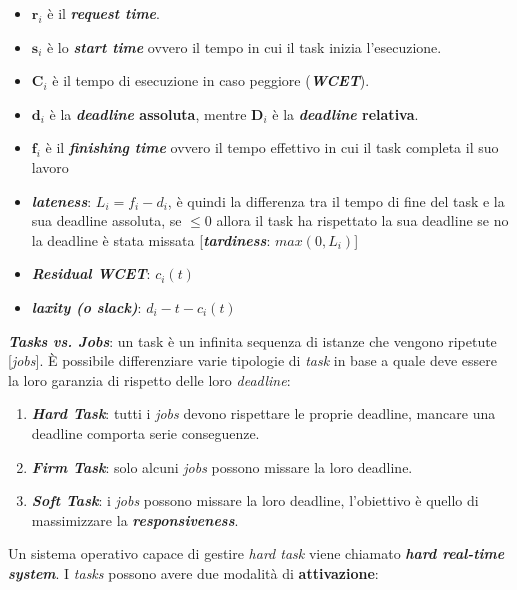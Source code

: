 \begin{itemize}
    \item $\mathbf{r}_i$ è il \textbf{\textit{request time}}.
    \item $\mathbf{s}_i$ è lo \textbf{\textit{start time}} ovvero il tempo in cui il task inizia l'esecuzione.
    \item $\mathbf{C}_i$ è il tempo di esecuzione in caso peggiore (\textbf{\textit{WCET}}).
    \item $\mathbf{d}_i$ è la \textbf{\textit{deadline} assoluta}, mentre $\mathbf{D}_i$ è la \textbf{\textit{deadline} relativa}.
    \item $\mathbf{f}_i$ è il \textbf{\textit{finishing time}} ovvero il tempo effettivo in cui il task completa il suo lavoro
    \item \textbf{\textit{lateness}}: $L_i = f_i - d_i$, è quindi la differenza tra il tempo di fine del task e la sua deadline assoluta, se $\leq 0$ allora il task ha rispettato la sua deadline se no la deadline è stata missata [\textbf{\textit{tardiness}}: $max(0, L_i)$]
    \item \textbf{\textit{Residual WCET}}: $c_i(t)$ 
    \item \textbf{\textit{laxity (o slack)}}: $d_i - t - c_i(t)$
\end{itemize}
\textbf{\textit{Tasks vs. Jobs}}: un task è un infinita sequenza di istanze che vengono ripetute [\textit{jobs}]. È possibile differenziare varie tipologie di \textit{task} in base a quale deve essere la loro garanzia di rispetto delle loro \textit{deadline}:
\begin{enumerate}
    \item \textbf{\textit{Hard Task}}: tutti i \textit{jobs} devono rispettare le proprie deadline, mancare una deadline comporta serie conseguenze.
    \item \textbf{\textit{Firm Task}}: solo alcuni \textit{jobs} possono missare la loro deadline.
    \item \textbf{\textit{Soft Task}}: i \textit{jobs} possono missare la loro deadline, l'obiettivo è quello di massimizzare la \textbf{\textit{responsiveness}}.
\end{enumerate}
Un sistema operativo capace di gestire \textit{hard task} viene chiamato \textbf{\textit{hard real-time system}}. I \textit{tasks} possono avere due modalità di \textbf{attivazione}:

